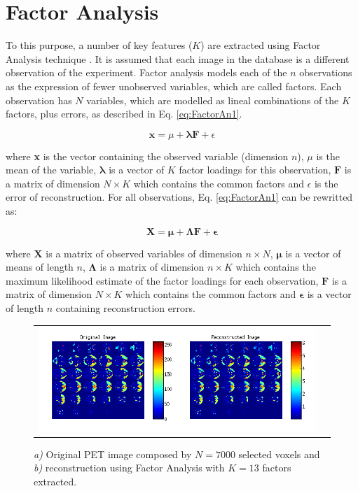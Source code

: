 \section{Factor Analysis}
\cite{Martinez201141,Martinez-Murcia20129676}

To this purpose, a number of key features ($K$) are extracted using Fac\-tor A\-na\-ly\-sis technique \cite{Harman73}. It is assumed that each image in the database is a different observation of the experiment. Factor analysis models each of the $n$ observations as the expression of fewer unobserved variables, which are called factors. Each observation has $N$ variables, which are modelled as lineal combinations of the $K$ factors, plus errors, as described in Eq. \ref{eq:FactorAn1}.

\begin{equation}\label{eq:FactorAn1}
\textbf{x} = \mu + \boldsymbol\lambda \textbf{F} + \epsilon
\end{equation}

\noindent where \textbf{x} is the vector containing the observed variable (dimension $n$), $\mu$ is the mean of the variable, $\boldsymbol\lambda$ is a vector of $K$ factor loadings for this observation, $\textbf{F}$ is a matrix of dimension $N \times K$ which contains the common factors and $\epsilon$ is the error of reconstruction. For all observations, Eq. \ref{eq:FactorAn1} can be rewritted as:

\begin{equation}\label{eq:FactorAn2}
\textbf{X} = \boldsymbol\mu + \boldsymbol\Lambda \textbf{F} + \boldsymbol\epsilon
\end{equation}

\noindent where $\textbf{X}$ is a matrix of observed variables of dimension $n \times N$, $\boldsymbol\mu$ is a vector of means of length $n$, $\boldsymbol\Lambda$ is a matrix of dimension $n \times K$ which contains the maximum likelihood estimate of the factor loadings for each observation, $\textbf{F}$ is a matrix of dimension $N \times K$ which contains the common factors and $\boldsymbol\epsilon$ is a vector of length $n$ containing reconstruction errors.

\begin{figure}[htp]
	\centering
	\begin{tabular}{cc}
		 \includegraphics[width=\textwidth]{gfx/ch5/reconstruction}\\
	\end{tabular}
	\caption{\textit{a)} Original PET image composed by $N=7000$ selected voxels and \textit{b)} reconstruction using Factor Analysis with $K=13$ factors extracted.}
	\label{fig:reconstruction}
\end{figure}

